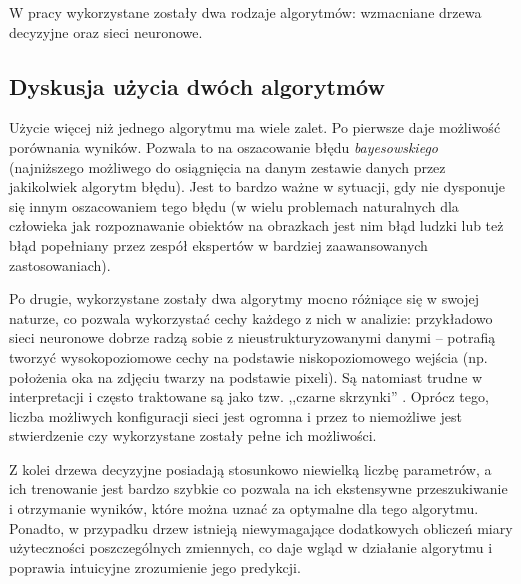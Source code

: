W pracy wykorzystane zostały dwa rodzaje algorytmów: wzmacniane drzewa decyzyjne oraz sieci neuronowe.
\FloatBarrier



\FloatBarrier
\subsection{Dyskusja użycia dwóch algorytmów}
\label{subsec:dyskusja-2algo}

Użycie więcej niż jednego algorytmu ma wiele zalet. 
Po pierwsze daje możliwość porównania wyników. Pozwala to na oszacowanie błędu \textit{bayesowskiego} (najniższego możliwego do osiągnięcia na danym zestawie danych przez jakikolwiek algorytm błędu). Jest to bardzo ważne w sytuacji, gdy nie dysponuje się innym oszacowaniem tego błędu (w wielu problemach naturalnych dla człowieka jak rozpoznawanie obiektów na obrazkach jest nim błąd ludzki lub też błąd popełniany przez zespół ekspertów w bardziej zaawansowanych zastosowaniach).

Po drugie, wykorzystane zostały dwa algorytmy mocno różniące się w swojej naturze, co pozwala wykorzystać cechy każdego z nich w analizie: przykładowo sieci neuronowe dobrze radzą sobie z nieustrukturyzowanymi danymi -- potrafią tworzyć wysokopoziomowe cechy na podstawie niskopoziomowego wejścia (np. położenia oka na zdjęciu twarzy na podstawie pixeli). Są natomiast trudne w interpretacji i często traktowane są jako tzw. ,,czarne skrzynki'' . Oprócz tego, liczba możliwych konfiguracji sieci jest ogromna i przez to niemożliwe jest stwierdzenie czy wykorzystane zostały pełne ich możliwości.

Z kolei drzewa decyzyjne posiadają stosunkowo niewielką liczbę parametrów, a ich trenowanie jest bardzo szybkie co pozwala na ich ekstensywne przeszukiwanie i otrzymanie wyników, które można uznać za optymalne dla tego algorytmu.
Ponadto, w przypadku drzew istnieją niewymagające dodatkowych obliczeń miary użyteczności poszczególnych zmiennych, co daje wgląd w działanie algorytmu i poprawia intuicyjne zrozumienie jego predykcji.







